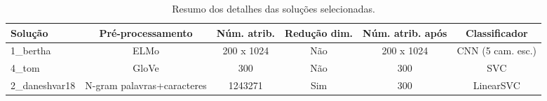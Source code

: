 \begin{table}[!thb]
    \centering
    \caption{Resumo dos detalhes das soluções selecionadas.}
    \begin{adjustbox}{max width={\textwidth},keepaspectratio}%
    \begin{tabular}{|l|c|c|c|c|c|}
        \hline
        \textbf{Solução}
        & \textbf{Pré-processamento} & \textbf{Núm. atrib.} & \textbf{Redução dim.} 
        & \textbf{Núm. atrib. após}  & \textbf{Classificador}
        \\ \hline
        1\_bertha        
        & ELMo          & 200 x 1024        & Não
        & 200 x 1024    & CNN (5 cam. esc.) 
        \\ \hline
        4\_tom
        & GloVe         & 300               & Não
        & 300           & SVC                
        \\ \hline
        2\_daneshvar18
        & N-gram palavras+caracteres & 1243271           & Sim
        & 300           & LinearSVC          
        \\ 
        \hline
    \end{tabular}
    \end{adjustbox}
    \label{tab:resumo-soluções} 
\end{table}
